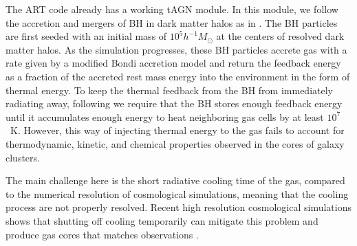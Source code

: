 \documentclass[letterpaper,11pt]{article}
\begin{document}
The ART code already has a working tAGN module. In this module, we follow the accretion and mergers of BH in dark matter halos as in \citet{booth_schaye09}. The BH particles are first seeded with an initial mass of $10^5h^{-1}M_\odot$ at the centers of resolved dark matter halos. As the simulation progresses, these BH particles accrete gas with a rate given by a modified Bondi accretion model and return the feedback energy as a fraction of the accreted rest mass energy into the environment in the form of thermal energy.  To keep the thermal feedback from the BH from immediately radiating away, following \citet{booth_schaye09} we require that the BH stores enough feedback energy until it accumulates enough energy to heat neighboring gas cells by at least $10^7$~K. However, this way of injecting thermal energy to the gas fails to account for thermodynamic, kinetic, and chemical properties observed in the cores of galaxy clusters. 

The main challenge here is the short radiative cooling time of the gas, compared to the numerical resolution of cosmological simulations, meaning that the cooling process are not properly resolved. Recent high resolution cosmological simulations shows that shutting off cooling temporarily can mitigate this problem and produce gas cores that matches observations \citep{Tremmel2018}. 
\end{document}
